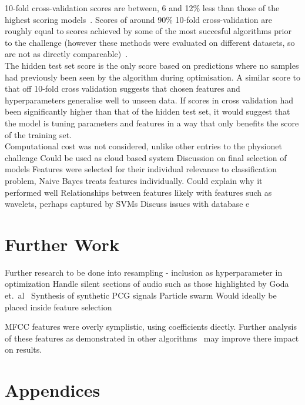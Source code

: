 \documentclass[titlepage, 12pt]{scrartcl} \usepackage{enumitem}
\begin{document}
10-fold cross-validation scores are between, 6 and 12\% less than those of
the highest scoring models~\parencite{Zabihi2016, Homsi2017, Kay2017}. Scores
of around 90\% 10-fold cross-validation are roughly equal to scores achieved by
some of the most succesful algorithms prior to the challenge (however these
methods were evaluated on different datasets, so are not as directly
compareable)~\parencite{Ari2010, Maglogiannis2009}.\\

The hidden test set score is the only score based on predictions where no
samples had previously been seen by the algorithm during optimisation. A
similar score to that off 10-fold cross validation suggests that chosen
features and hyperparameters generalise well to unseen data. If scores in cross
validation had been significantly higher than that of the hidden test set, it
would suggest that the model is tuning parameters and features in a way that
only benefits the score of the training set.\\


Computational cost was not considered, unlike other entries to the physionet
challenge
Could be used as cloud based system
Discussion on final selection of models
Features were selected for their individual relevance to classification
problem, Naive Bayes treats features individually. Could explain why it
performed well
Relationships between features likely with features such as wavelets, perhaps
captured by SVMs
Discuss issues with database e



\section{Further Work}\label{FurtherWork}
Further research to be done into resampling - inclusion as hyperparameter in
optimization
Handle silent sections of audio such as those highlighted by Goda et.\
al~\parencite{Goda2016}
Synthesis of synthetic PCG signals
Particle swarm Would ideally be placed inside feature selection

MFCC features were overly symplistic, using coefficients diectly. Further
analysis of these features as demonstrated in other
algorithms~\parencite{Zabihi2016} may improve there impact on results.

\appendix
\section*{Appendices}
\renewcommand{\thesubsection}{\Alph{subsection}}
\end{document}
